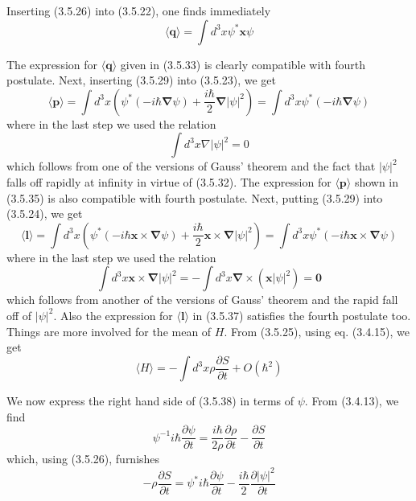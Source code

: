 \documentclass{article}
\begin{document}
Inserting (3.5.26) into (3.5.22), one finds immediately
$$
\begin{equation*}
\langle\boldsymbol{q}\rangle=\int d^{3} x \psi^{*} \boldsymbol{x} \psi \tag{3.5.33}
\end{equation*}
$$

The expression for $\langle\boldsymbol{q}\rangle$ given in (3.5.33) is clearly compatible with fourth postulate. Next, inserting (3.5.29) into (3.5.23), we get
$$
\begin{equation*}
\langle\boldsymbol{p}\rangle=\int d^{3} x\left(\psi^{*}(-i \hbar \boldsymbol{\nabla} \psi)+\frac{i \hbar}{2} \boldsymbol{\nabla}|\psi|^{2}\right)=\int d^{3} x \psi^{*}(-i \hbar \boldsymbol{\nabla} \psi) \tag{3.5.34}
\end{equation*}
$$
where in the last step we used the relation
$$
\begin{equation*}
\int d^{3} x \nabla|\psi|^{2}=0 \tag{3.5.35}
\end{equation*}
$$
which follows from one of the versions of Gauss' theorem and the fact that $|\psi|^{2}$ falls off rapidly at infinity in virtue of (3.5.32). The expression for $\langle\boldsymbol{p}\rangle$ shown in (3.5.35) is also compatible with fourth postulate. Next, putting (3.5.29) into (3.5.24), we get
$$
\begin{equation*}
\langle\boldsymbol{l}\rangle=\int d^{3} x\left(\psi^{*}(-i \hbar \boldsymbol{x} \times \boldsymbol{\nabla} \psi)+\frac{i \hbar}{2} \boldsymbol{x} \times \boldsymbol{\nabla}|\psi|^{2}\right)=\int d^{3} x \psi^{*}(-i \hbar \boldsymbol{x} \times \boldsymbol{\nabla} \psi) \tag{3.5.36}
\end{equation*}
$$
where in the last step we used the relation
$$
\begin{equation*}
\int d^{3} x \boldsymbol{x} \times \boldsymbol{\nabla}|\psi|^{2}=-\int d^{3} x \boldsymbol{\nabla} \times\left(\boldsymbol{x}|\psi|^{2}\right)=\mathbf{0} \tag{3.5.37}
\end{equation*}
$$
which follows from another of the versions of Gauss' theorem and the rapid fall off of $|\psi|^{2}$. Also the expression for $\langle\boldsymbol{l}\rangle$ in (3.5.37) satisfies the fourth postulate too. Things are more involved for the mean of $H$. From (3.5.25), using eq. (3.4.15), we get
$$
\begin{equation*}
\langle H\rangle=-\int d^{3} x \rho \frac{\partial S}{\partial t}+O\left(\hbar^{2}\right) \tag{3.5.38}
\end{equation*}
$$

We now express the right hand side of (3.5.38) in terms of $\psi$. From (3.4.13), we find
$$
\begin{equation*}
\psi^{-1} i \hbar \frac{\partial \psi}{\partial t}=\frac{i \hbar}{2 \rho} \frac{\partial \rho}{\partial t}-\frac{\partial S}{\partial t} \tag{3.5.39}
\end{equation*}
$$
which, using (3.5.26), furnishes
$$
\begin{equation*}
-\rho \frac{\partial S}{\partial t}=\psi^{*} i \hbar \frac{\partial \psi}{\partial t}-\frac{i \hbar}{2} \frac{\partial|\psi|^{2}}{\partial t} \tag{3.5.40}
\end{equation*}
$$
\end{document}
